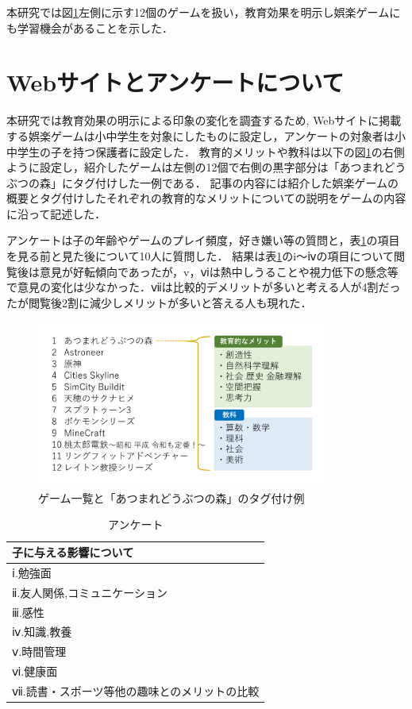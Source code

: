 \documentclass[twocolumn,10pt,a4j]{ltjsarticle}
\begin{document}
本研究では図\ref{fig:ゲーム一覧}左側に示す12個のゲームを扱い，教育効果を明示し娯楽ゲームにも学習機会があることを示した．


\section{Webサイトとアンケートについて}
本研究では教育効果の明示による印象の変化を調査するため, Webサイトに掲載する娯楽ゲームは小中学生を対象にしたものに設定し，アンケートの対象者は小中学生の子を持つ保護者に設定した．
教育的メリットや教科は以下の図\ref{fig:ゲーム一覧}の右側ように設定し，紹介したゲームは左側の12個で右側の黒字部分は「あつまれどうぶつの森」にタグ付けした一例である．
記事の内容には紹介した娯楽ゲームの概要とタグ付けしたそれぞれの教育的なメリットについての説明をゲームの内容に沿って記述した．

アンケートは子の年齢やゲームのプレイ頻度，好き嫌い等の質問と，表\ref{table:anque}の項目を見る前と見た後について10人に質問した．
結果は表\ref{table:anque}のi～ⅳの項目について閲覧後は意見が好転傾向であったが，v，ⅵは熱中しうることや視力低下の懸念等で意見の変化は少なかった．ⅶは比較的デメリットが多いと考える人が4割だったが閲覧後2割に減少しメリットが多いと答える人も現れた．

\begin{figure}[h]
 \begin{center}
  \includegraphics[clip,width=95mm,height=55mm]{games.pdf}
 \end{center}
 \caption{ゲーム一覧と「あつまれどうぶつの森」のタグ付け例}
 \label{fig:ゲーム一覧}
\end{figure}

\begin{table}[h]
 \caption{アンケート}
 \label{table:anque}
 \small
 \centering
  \begin{tabular}{l}
  \hline
  子に与える影響について \\
   \hline \hline
   ⅰ.勉強面 \\
   ⅱ.友人関係,コミュニケーション\\
   ⅲ.感性\\
   ⅳ.知識,教養 \\
   ⅴ.時間管理   \\
   ⅵ.健康面 \\
   ⅶ.読書・スポーツ等他の趣味とのメリットの比較 \\
   \hline
  \end{tabular}
\end{table}
\end{document}
